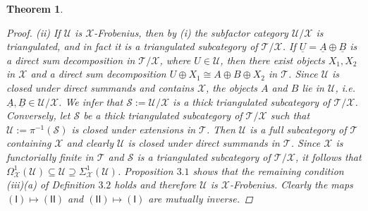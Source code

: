 \documentclass[oneside, a4paper,reqno]{amsart}
\numberwithin{equation}{section}
\newtheorem{thm}{Theorem}[section]
\theoremstyle{definition}
\begin{document}
\begin{thm}
\begin{proof}
(ii) If  ${\mathcal U}$ is ${\mathcal X}$-Frobenius, then by (i) the subfactor category ${\mathcal U}/{\mathcal X}$ is triangulated, and in fact it is a triangulated subcategory of ${\mathcal T}/{\mathcal X}$.  If $\underline{U} = {\underline A} \oplus {\underline B}$ is a direct sum decomposition in ${\mathcal T}/{\mathcal X}$, where $U \in{\mathcal U}$, then there exist objects $X_{1}, X_{2}$ in ${\mathcal X}$ and a direct sum decomposition $U \oplus X_{1} \cong A \oplus B \oplus X_{2}$ in ${\mathcal T}$. Since ${\mathcal U}$ is closed under direct summands and contains ${\mathcal X}$, the objects $A$ and $B$ lie in ${\mathcal U}$, i.e. ${\underline A}, {\underline B} \in {\mathcal U}/{\mathcal X}$. We infer that $\mathcal S := {\mathcal U}/{\mathcal X}$ is a thick triangulated subcategory of ${\mathcal T}/{\mathcal X}$. Conversely, let $\mathcal S$ be a thick triangulated subcategory of ${\mathcal T}/{\mathcal X}$ such that ${\mathcal U} := \pi^{-1}(\mathcal S)$ is closed under extensions in ${\mathcal T}$. Then ${\mathcal U}$ is a full subcategory of ${\mathcal T}$ containing ${\mathcal X}$ and clearly ${\mathcal U}$ is closed under direct summands in ${\mathcal T}$.  Since ${\mathcal X}$ is functorially finite in ${\mathcal T}$ and $\mathcal S$ is a triangulated subcategory of ${\mathcal T}/{\mathcal X}$, it follows that $\Omega^{1}_{\mathcal X}({\mathcal U}) \subseteq {\mathcal U} \supseteq\Sigma^{1}_{\mathcal X}({\mathcal U})$. Proposition $3.1$ shows that the remaining condition (iii)(a) of Definition $3.2$ holds and therefore  ${\mathcal U}$ is ${\mathcal X}$-Frobenius.  Clearly the maps $\mathsf{(I)} \mapsto \mathsf{(II)}$ and $\mathsf{(II)} \mapsto \mathsf{(I)}$ are mutually inverse.  
\end{proof}
\end{thm}  
\end{document}
